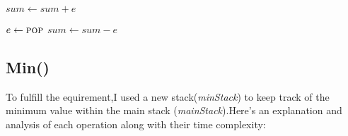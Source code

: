 \documentclass[12pt]{article}
\begin{document}
\begin{algorithm*}
    \begin{algorithmic}[1]
    
        \State $sum \gets sum + e$
        \State {}
    \EndFunction
    
    \end{algorithmic}
\end{algorithm*}

\begin{algorithm*}
    \begin{algorithmic}[1]
    
        \State $e \gets \Call{pop}{}$
        \State $sum \gets sum - e$
    \EndFunction
    
    \end{algorithmic}
\end{algorithm*}

\begin{algorithm}
    \begin{algorithmic}[1]
    
        \State {}
    \EndFunction
    
    \end{algorithmic}
\end{algorithm}

\newpage
\subsection*{Min()}
To fulfill the equirement,I used a new stack(\textit{minStack}) to keep track 
of the minimum value within the main stack (\textit{mainStack}).Here's an 
explanation and analysis of each operation along with their time complexity:
\end{document}

